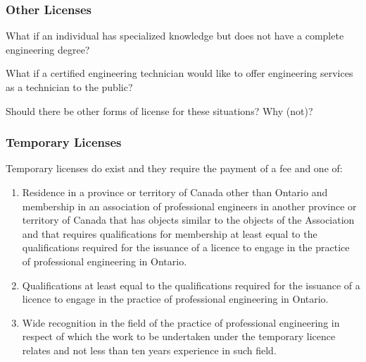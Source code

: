 \begin{frame}
\frametitle{Other Licenses}

What if an individual has specialized knowledge but does not have a complete engineering degree?

What if a certified engineering technician would like to offer engineering services as a technician to the public?

Should there be other forms of license for these situations? Why (not)?

\end{frame}




\begin{frame}
\frametitle{Temporary Licenses}

Temporary licenses do exist and they require the payment of a fee and one of:

\begin{enumerate}
\item Residence in a province or territory of Canada other than Ontario and membership in an association of professional engineers in another province or territory of Canada that has objects similar to the objects of the Association and that requires qualifications for membership at least equal to the qualifications required for the issuance of a licence to engage in the practice of professional engineering in Ontario.
\item Qualifications at least equal to the qualifications required for the issuance of a licence to engage in the practice of professional engineering in Ontario.
\item Wide recognition in the field of the practice of professional engineering in respect of which the work to be undertaken under the temporary licence relates and not less than ten years experience in such field. 
\end{enumerate}

\end{frame}



